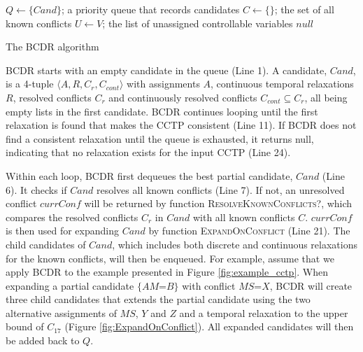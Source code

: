 \documentclass[jair,twoside,11pt,theapa]{article}
\begin{document}
	
\begin{algorithm}[h!]
		
\SetAlgoLined
{}
\Indm
{}
\Initialize{}
\;
{$Q\leftarrow\{\mathit{Cand}\}$; a priority queue that records candidates}\;
{$C\leftarrow\{\}$; the set of all known conflicts}\;
{$U\leftarrow V$; the list of unassigned controllable variables}\;
\Indm
\Algorithm{}
\Indp
{}
\Return $null$\;
\caption{The BCDR algorithm}
\label{alg:bcdr}
\end{algorithm}

BCDR starts with an empty candidate in the queue (Line 1). A candidate, $\mathit{Cand}$,
is a 4-tuple $\langle A,R,C_r,C_{cont}\rangle $ with assignments $A$, continuous temporal
relaxations $R$, resolved conflicts $C_r$ and continuously resolved conflicts
$C_{cont}\subseteq C_r$, all being empty lists in the first candidate. BCDR
continues looping until the first relaxation is found that makes the CCTP
consistent (Line 11). If BCDR does not find a consistent relaxation until the
queue is exhausted, it returns null, indicating that no relaxation exists for the
input CCTP (Line 24).


Within each loop, BCDR first dequeues the best partial candidate, $\mathit{Cand}$ (Line
6). It checks if $\mathit{Cand}$ resolves all known conflicts (Line 7). If not, an
unresolved conflict $\mathit{currConf}$ will be returned by function
\textsc{ResolveKnownConflicts?}, which compares the resolved conflicts $C_r$ in
$\mathit{Cand}$ with all known conflicts $C$. $\mathit{currConf}$ is then used for expanding $\mathit{Cand}$
by function \textsc{ExpandOnConflict} (Line 21). The child candidates of $\mathit{Cand}$,
which includes both discrete and continuous relaxations for the known conflicts,
will then be enqueued. For example, assume that we apply BCDR to the example
presented in Figure \ref{fig:example_cctp}. When expanding
a partial candidate $\{AM$=$B\}$ with conflict
$MS$=$X$, BCDR will create three child candidates that extends
the partial candidate using the two alternative assignments of $MS$, $Y$ and $Z$
and a temporal relaxation to the upper bound of $C_{17}$ (Figure
\ref{fig:ExpandOnConflict}). All expanded candidates
will then be added back to $Q$.
\end{document}
